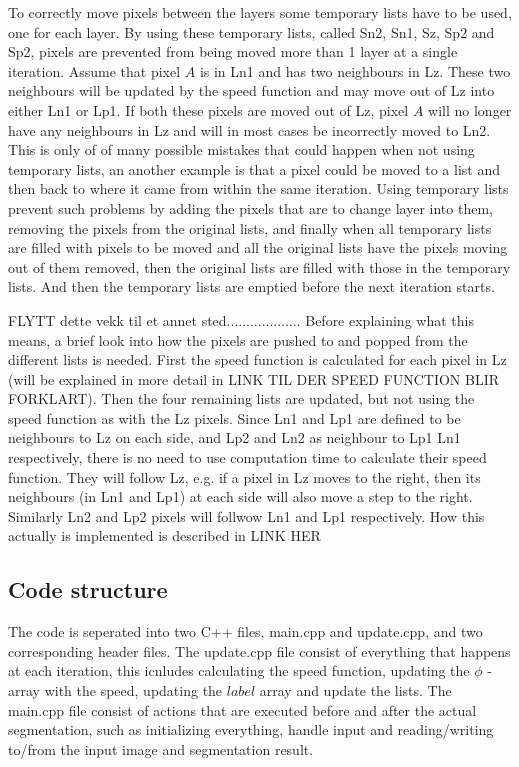 To correctly move pixels between the layers some temporary lists have to be used, one for each layer. By using these temporary lists, called Sn2, Sn1, Sz, Sp2 and Sp2, pixels are prevented from being moved more than 1 layer at a single iteration. Assume that pixel $A$ is in Ln1 and has two neighbours in Lz. These two neighbours will be updated by the speed function and may move out of Lz into either Ln1 or Lp1. If both these pixels are moved out of Lz, pixel $A$ will no longer have any neighbours in Lz and will in most cases be incorrectly moved to Ln2. This is only of of many possible mistakes that could happen when not using temporary lists, an another example is that a pixel could be moved to a list and then back to where it came from within the same iteration. Using temporary lists prevent such problems by adding the pixels that are to change layer into them, removing the pixels from the original lists, and finally when all temporary lists are filled with pixels to be moved and all the original lists have the pixels moving out of them removed, then the original lists are filled with those in the temporary lists. And then the temporary lists are emptied before the next iteration starts.


FLYTT dette vekk til et annet sted...................
Before explaining what this means, a brief look into how the pixels are pushed to and popped from the different lists is needed. First the speed function is calculated for each pixel in Lz (will be explained in more detail in LINK TIL DER SPEED FUNCTION BLIR FORKLART). Then the four remaining lists are updated, but not using the speed function as with the Lz pixels. Since Ln1 and Lp1 are defined to be neighbours to Lz on each side, and Lp2 and Ln2 as neighbour to Lp1 Ln1 respectively, there is no need to use computation time to calculate their speed function. They will follow Lz, e.g. if a pixel in Lz moves to the right, then its neighbours (in Ln1 and Lp1) at each side will also move a step to the right. Similarly Ln2 and Lp2 pixels will follwow Ln1 and Lp1 respectively. How this actually is implemented is described in LINK HER

\subsection{Code structure}
The code is seperated into two C++ files, main.cpp and update.cpp, and two corresponding header files. The update.cpp file consist of everything that happens at each iteration, this icnludes calculating the speed function, updating the $\phi$ - array with the speed, updating the $label$ array and update the lists. The main.cpp file consist of actions that are executed before and after the actual segmentation, such as initializing everything, handle input and reading/writing to/from the input image and segmentation result. 

